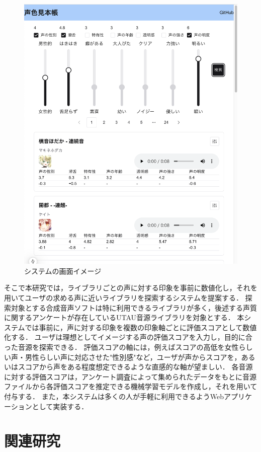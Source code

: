 \documentclass[a4j,8pt,twocolumn]{extarticle}
\begin{document}
\begin{figure}[h]
  \centering
  \includegraphics[width=0.9\linewidth]{fig/site_image.png}
  \caption{システムの画面イメージ}
  \label{fig:site_image}
\end{figure}

そこで本研究では，ライブラリごとの声に対する印象を事前に数値化し，それを用いてユーザの求める声に近いライブラリを探索するシステムを提案する．
探索対象とする合成音声ソフトは特に利用できるライブラリが多く，後述する声質に関するアンケートが存在しているUTAU音源ライブラリを対象とする．
本システムでは事前に，声に対する印象を複数の印象軸ごとに評価スコアとして数値化する．
ユーザは理想としてイメージする声の評価スコアを入力し，目的に合った音源を探索できる．
評価スコアの軸には，例えばスコアの高低を女性らしい声・男性らしい声に対応させた"性別感"など，ユーザが声からスコアを，あるいはスコアから声をある程度想定できるような直感的な軸が望ましい．
各音源に対する評価スコアは，アンケート調査によって集められたデータをもとに音源ファイルから各評価スコアを推定できる機械学習モデルを作成し，それを用いて付与する．
また，本システムは多くの人が手軽に利用できるようWebアプリケーションとして実装する．

\section{関連研究}
\end{document}
